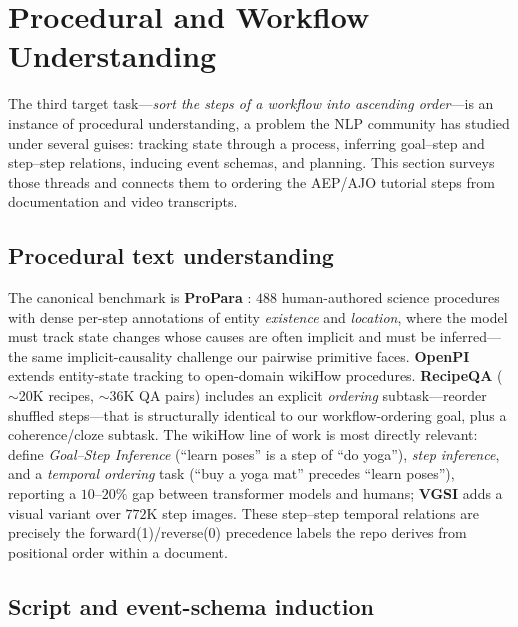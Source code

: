 \section{Procedural and Workflow Understanding}
\label{sec:procedural}

The third target task---\emph{sort the steps of a workflow into ascending
order}---is an instance of procedural understanding, a problem the NLP
community has studied under several guises: tracking state through a process,
inferring goal--step and step--step relations, inducing event schemas, and
planning. This section surveys those threads and connects them to ordering
the AEP/AJO tutorial steps from documentation and video transcripts.

\subsection{Procedural text understanding}

The canonical benchmark is \textbf{ProPara} \citep{proc:dalvi2018propara}:
$488$ human-authored science procedures with dense per-step annotations of
entity \emph{existence} and \emph{location}, where the model must track state
changes whose causes are often implicit and must be inferred---the same
implicit-causality challenge our pairwise primitive faces.
\textbf{OpenPI} \citep{proc:tandon2020proglobal} extends entity-state tracking
to open-domain wikiHow procedures. \textbf{RecipeQA}
\citep{proc:yagcioglu2018recipeqa} ($\sim$20K recipes, $\sim$36K QA pairs)
includes an explicit \emph{ordering} subtask---reorder shuffled steps---that is
structurally identical to our workflow-ordering goal, plus a coherence/cloze
subtask. The wikiHow line of work is most directly relevant:
\citet{proc:zhang2020wikihow} define \emph{Goal--Step Inference} (``learn
poses'' is a step of ``do yoga''), \emph{step inference}, and a \emph{temporal
ordering} task (``buy a yoga mat'' precedes ``learn poses''), reporting a
$10$--$20\%$ gap between transformer models and humans; \textbf{VGSI}
\citep{proc:yang2021vgsi} adds a visual variant over $772$K step images.
These step--step temporal relations are precisely the forward(1)/reverse(0)
precedence labels the repo derives from positional order within a document.

\subsection{Script and event-schema induction}

